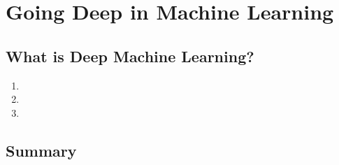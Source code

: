 \chapter{Going Deep in Machine Learning}\label{ch:chapter2}

\section{What is Deep Machine Learning?} 
	\lipsum[1]
\begin{enumerate}
	\item 	\lipsum[1]
	
	\item 	\lipsum[2]
	
	\item 	\lipsum[3]
\end{enumerate}


\section{Summary}
	\lipsum[1]